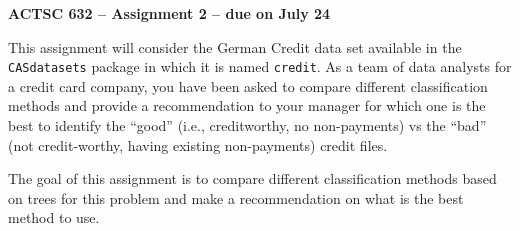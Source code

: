 \documentclass[11pt]{article}
\begin{document}
\begin{center}
{\large \bf ACTSC 632 -- Assignment 2 -- due on July 24} \\
\end{center}

This assignment will consider the German Credit data set available in the {\tt CASdatasets} package in which it is named {\tt credit}.  As a team of data analysts for a credit card company, you have been asked to compare different classification methods and provide a recommendation to your manager for which one is the best to identify the ``good'' (i.e., creditworthy, no non-payments) vs the ``bad'' (not credit-worthy, having existing non-payments) credit files.

The goal of this assignment is to compare different classification methods based on trees for this problem and make a recommendation on what is the best method to use.
\end{document}
